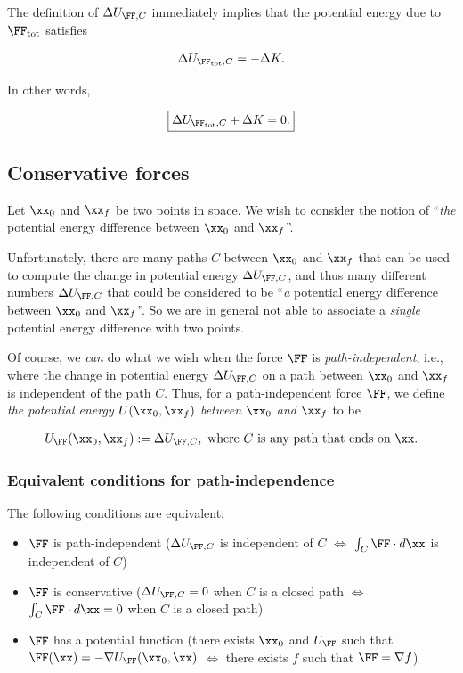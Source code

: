 \documentclass{article}
\begin{document}
The definition of $\Delta U_{\FF, C}$ immediately implies that the potential energy due to $\FF_{\text{tot}}$ satisfies

\begin{align*}
    \Delta U_{\FF_{\text{tot}}, C} = -\Delta K.
\end{align*}

In other words,

\begin{align*}
    \boxed
    {
        \Delta U_{\FF_{\text{tot}}, C} + \Delta K = 0.
    }
\end{align*}

\subsection*{Conservative forces}

Let $\xx_0$ and $\xx_f$ be two points in space. We wish to consider the notion of ``\textit{the} potential energy difference between $\xx_0$ and $\xx_f$''. 

Unfortunately, there are many paths $C$ between $\xx_0$ and $\xx_f$ that can be used to compute the change in potential energy $\Delta U_{\FF, C}$, and thus many different numbers $\Delta U_{\FF, C}$ that could be considered to be ``\textit{a} potential energy difference between $\xx_0$ and $\xx_f$''. So we are in general not able to associate a \textit{single} potential energy difference with two points.

Of course, we \textit{can} do what we wish when the force $\FF$ is \textit{path-independent}, i.e., where the change in potential energy $\Delta U_{\FF, C}$ on a path between $\xx_0$ and $\xx_f$ is independent of the path $C$. Thus, for a path-independent force $\FF$, we define \textit{the potential energy $U(\xx_0, \xx_f)$ between $\xx_0$ and $\xx_f$} to be

\begin{align*}
    U_{\FF}(\xx_0, \xx_f) := \Delta U_{\FF, C}, \text{ where $C$ is any path that ends on $\xx$}.
\end{align*}

\subsubsection*{Equivalent conditions for path-independence}

The following conditions are equivalent:

\begin{itemize}
    \item $\FF$ is path-independent ($\Delta U_{\FF, C}$ is independent of $C$ $\iff$ $\int_C \FF \cdot d\xx$ is independent of $C$)
    \item $\FF$ is conservative ($\Delta U_{\FF, C} = 0$ when $C$ is a closed path $\iff$ $\int_C \FF \cdot d\xx = 0$ when $C$ is a closed path)
    \item $\FF$ has a potential function (there exists $\xx_0$ and $U_{\FF}$ such that $\FF(\xx) = - \nabla U_{\FF}(\xx_0, \xx)$ $\iff$ there exists $f$ such that $\FF = \nabla f$)
\end{itemize}
\end{document}
